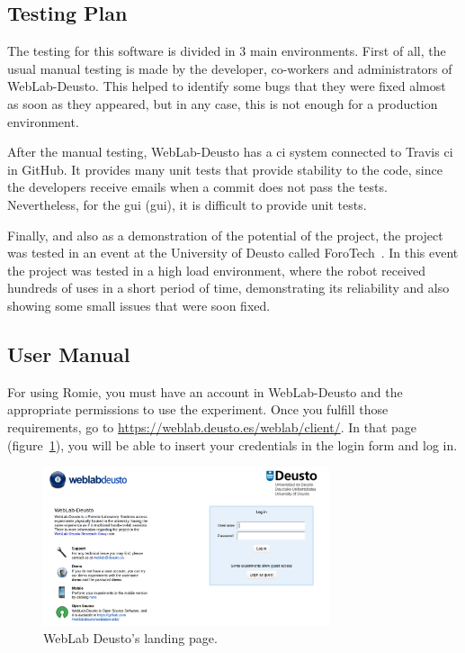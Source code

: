\subsection{Testing Plan}

The testing for this software is divided in 3 main environments. First of all, the usual manual
testing is made by the developer, co-workers and administrators of WebLab-Deusto. This helped to
identify some bugs that they were fixed almost as soon as they appeared, but in any case, this is
not enough for a production environment.

After the manual testing, WebLab-Deusto has a \acrlong{ci} system connected to Travis \acrshort{ci}
in GitHub. It provides many unit tests that provide stability to the code, since the developers
receive emails when a commit does not pass the tests. Nevertheless, for the \acrlong{gui}
(\acrshort{gui}), it is difficult to provide unit tests.

Finally, and also as a demonstration of the potential of the project, the project was tested in an
event at the University of Deusto called ForoTech~\cite{forotech}. In this event the project was
tested in a high load environment, where the robot received hundreds of uses in a short period of
time, demonstrating its reliability and also showing some small issues that were soon fixed.

\subsection{User Manual}

For using Romie, you must have an account in WebLab-Deusto and the appropriate permissions to use
the experiment. Once you fulfill those requirements, go to
\url{https://weblab.deusto.es/weblab/client/}. In that page (figure~\ref{fig:man:weblab}), you will
be able to insert your credentials in the login form and log in.

\begin{figure}[ht]
	\centering
	\includegraphics[width=0.75\textwidth]{fig/manuals/weblab}
	\caption{WebLab Deusto's landing page.}
	\label{fig:man:weblab}
\end{figure}


